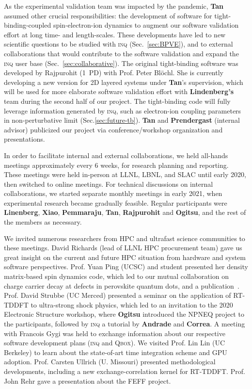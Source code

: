As the experimental validation team was impacted by the pandemic, {\bf Tan} assumed other crucial responsibilities: the development of software for tight-binding-coupled spin-electron-ion dynamics to augment our software validation effort at long time- and length-scales. 
These developments have led to new scientific questions to be studied with \textsc{inq} (Sec.~\ref{sec:BPVE}), and to external collaborations that would contribute to the software validation and expand the \textsc{inq} user base (Sec.~\ref{sec:collaborative}). 
The original tight-binding software was developed by Rajpurohit (1~PD) with Prof. Peter Bl\"{o}chl. 
She is currently developing a new version for 2D layered systems under {\bf Tan}'s supervision, which will be used for more elaborate software validation effort with {\bf Lindenberg's} team during the second half of our project.
The tight-binding code will fully leverage information generated by \textsc{inq}, such as electron-ion coupling parameters in non-perturbative limit (Sec.\ref{sec:future-tb}). 
{\bf Tan} and {\bf Prendergast} (internal advisor) publicized our project via conference/workshop organization and presentations. 

In order to facilitate internal and external collaborations, we held all-hands meetings approximately every 6 weeks, for research planning and reporting.
These meetings were held in-person at LLNL, LBNL, and SLAC until early 2020, then switched to online meetings.
For technical discussions on internal collaborations, we started separate monthly meetings in early 2021, when experimental research became gradually feasible. 
Regular participants were {\bf Linenberg}, {\bf Xiao}, {\bf Pemmaraju}, {\bf Tan}, {\bf Rajpurohit} and {\bf Ogitsu}, and the rest of the members as necessary.

We invited numerous researchers from HPC and ultrafast science communities to these meetings. 
David Richards (lead of LLNL HPC procurement team) gave us great insight on the current and future HPC situation from hardware and system software perspectives. 
Prof. Yuan Ping (UCSC) and student presented her density matrix-based spin dynamics code, which led to our mutual collaboration on charge carrier decay at defects in perovskite quantum dots, and a publication~\cite{Smart2021}. 
Prof. David Strubbe (UC Merced) presented a seminar on the application of RT-TDDFT to ultra-strong shock physics, which led to an invitation to the 2020 Electronic Structure workshop, where {\bf Ogitsu} introduced the NPNEQ project to the participants, followed by \textsc{inq} a tutorial by {\bf Andrade} and {\bf Correa}. 
A meeting with Francois Gygi was held to exchange information about our respective software development plans (\textsc{inq} and \textsc{Qbox}). 
We visited Prof. Lin Lin (UC Berkeley) to learn about the state-of-art time integration scheme and GPU adoption. 
Prof. Carsten Ullrich (U. Missouri) presented methodological developments, including a new exchange-correlation kernel for RT-TDDFT. 
Prof. John Rehr gave a presentation about the FEFF project.


